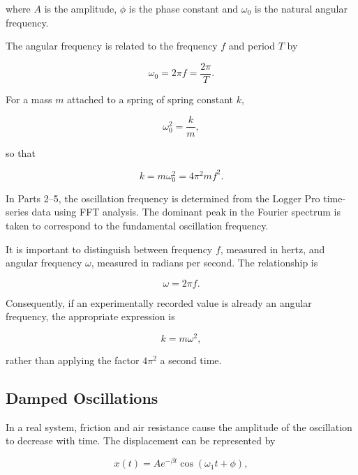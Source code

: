 \documentclass[12pt,a4paper]{article}
\begin{document}
where $A$ is the amplitude, $\phi$ is the phase constant and $\omega_0$ is the natural angular frequency.

The angular frequency is related to the frequency $f$ and period $T$ by

\begin{equation}
\omega_0=2\pi f=\frac{2\pi}{T}.
\label{eq:angular}
\end{equation}

For a mass $m$ attached to a spring of spring constant $k$,

\begin{equation}
\omega_0^2=\frac{k}{m},
\label{eq:natural}
\end{equation}

so that

\begin{equation}
k=m\omega_0^2=4\pi^2mf^2.
\label{eq:k_frequency}
\end{equation}

In Parts 2--5, the oscillation frequency is determined from the Logger Pro time-series data using FFT analysis. The dominant peak in the Fourier spectrum is taken to correspond to the fundamental oscillation frequency.

It is important to distinguish between frequency $f$, measured in hertz, and angular frequency $\omega$, measured in radians per second. The relationship is

\begin{equation}
\omega=2\pi f.
\end{equation}

Consequently, if an experimentally recorded value is already an angular frequency, the appropriate expression is

\begin{equation}
k=m\omega^2,
\end{equation}

rather than applying the factor $4\pi^2$ a second time.

\subsection{Damped Oscillations}

In a real system, friction and air resistance cause the amplitude of the oscillation to decrease with time. The displacement can be represented by

\begin{equation}
x(t)=Ae^{-\beta t}\cos(\omega_1t+\phi),
\label{eq:damped}
\end{equation}
\end{document}
